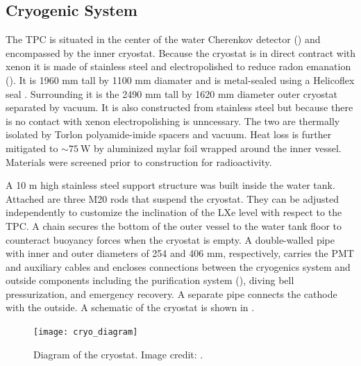 \subsection{Cryogenic System}
\label{subsec:xenon1t_cryo}
The TPC is situated in the center of the water Cherenkov detector () and encompassed by the inner
cryostat.  Because the cryostat is in direct contract with xenon it is made of stainless steel and electropolished to reduce radon
emanation ().  It is 1960 mm tall by 1100 mm diamater and is metal-sealed
using a Helicoflex seal .  Surrounding it is the 2490 mm tall by 1620 mm diameter outer cryostat separated by
vacuum.  It is also constructed from stainless steel but
because there is no contact with xenon electropolishing is unncessary.  The two are thermally isolated by Torlon polyamide-imide spacers
and vacuum.  Heat loss is further mitigated to ${\sim} 75\ \mathrm{W}$ by aluminized mylar foil wrapped around the inner
vessel.  Materials were screened prior to construction for
radioactivity.

A 10 m high stainless steel support structure was built inside the water tank.  Attached are three M20 rods that suspend the
cryostat.  They can be adjusted independently to customize the inclination of the LXe level with respect to the
TPC.  A chain secures the bottom of the outer vessel to the water tank floor to counteract buoyancy forces when the cryostat is empty.  A
double-walled pipe with inner and outer diameters of 254 and 406 mm, respectively, carries the PMT and auxiliary cables and encloses
connections between the cryogenics system and outside components including the purification system
(), diving bell pressurization, and emergency recovery.  A separate pipe connects the
cathode with the outside.  A schematic of the cryostat is shown in .

\begin{figure}
\centering
\texttt{[image: cryo\_diagram]}
\caption{Diagram of the cryostat.  Image credit: .}
\label{fig:xenon1t_cryo_cryostat_diagram}
\end{figure}

